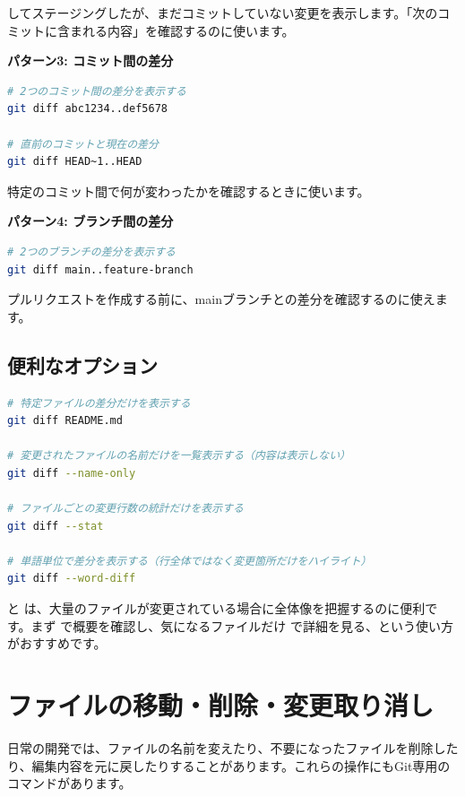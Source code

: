  してステージングしたが、まだコミットしていない変更を表示します。「次のコミットに含まれる内容」を確認するのに使います。

\textbf{パターン3: コミット間の差分}

\begin{lstlisting}[language=bash]
# 2つのコミット間の差分を表示する
git diff abc1234..def5678

# 直前のコミットと現在の差分
git diff HEAD~1..HEAD
\end{lstlisting}

特定のコミット間で何が変わったかを確認するときに使います。

\textbf{パターン4: ブランチ間の差分}

\begin{lstlisting}[language=bash]
# 2つのブランチの差分を表示する
git diff main..feature-branch
\end{lstlisting}

プルリクエストを作成する前に、mainブランチとの差分を確認するのに使えます。

\subsection{便利なオプション}

\begin{lstlisting}[language=bash]
# 特定ファイルの差分だけを表示する
git diff README.md

# 変更されたファイルの名前だけを一覧表示する（内容は表示しない）
git diff --name-only

# ファイルごとの変更行数の統計だけを表示する
git diff --stat

# 単語単位で差分を表示する（行全体ではなく変更箇所だけをハイライト）
git diff --word-diff
\end{lstlisting}

 と  は、大量のファイルが変更されている場合に全体像を把握するのに便利です。まず  で概要を確認し、気になるファイルだけ  で詳細を見る、という使い方がおすすめです。

\section{ファイルの移動・削除・変更取り消し}

日常の開発では、ファイルの名前を変えたり、不要になったファイルを削除したり、編集内容を元に戻したりすることがあります。これらの操作にもGit専用のコマンドがあります。

